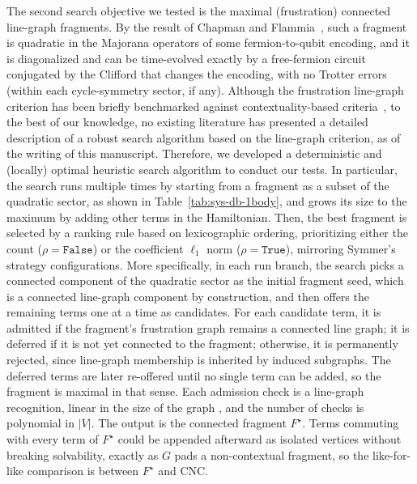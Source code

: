 \documentclass[%
 aip,
 amsmath,amssymb,
 reprint,%
]{revtex4-1}
\newcommand{\True}{\mathtt{True}}        %
\newcommand{\False}{\mathtt{False}}
\newcommand{\frag}{F}                    %
\newcommand{\rankflag}{\rho}             %
\begin{document}
The second search objective we tested is the maximal (frustration) connected line-graph fragments. {By the result} of Chapman and Flammia~\cite{Chapman_Fermions}, such a fragment is quadratic in the Majorana operators of some fermion-to-qubit encoding, and it is diagonalized and can be time-evolved exactly by a free-fermion circuit conjugated by the Clifford that changes the encoding, with no Trotter errors {(within each cycle-symmetry sector, if any)}. Although the frustration line-graph criterion has been briefly benchmarked against contextuality-based criteria~\cite{patel2024exactly}, to the best of our knowledge, no existing literature has presented a detailed description of a robust search algorithm based on the line-graph criterion, as of the writing of this manuscript. Therefore, we developed a deterministic and (locally) optimal heuristic search algorithm to conduct our tests. In particular, the search runs multiple times by starting from a fragment as a subset of the quadratic sector, as shown in Table~\ref{tab:sys-db-1body}, and grows its size to the maximum by adding other terms in the Hamiltonian. Then, the best fragment is selected by a ranking rule based on lexicographic ordering, prioritizing either the count ($\rankflag=\False$) or the coefficient $\ell_1$ norm ($\rankflag=\True$), mirroring Symmer's strategy configurations. More specifically, in each run branch, the search picks a connected component of the quadratic sector as the initial fragment seed, which is a connected line-graph component by construction, and then offers the remaining terms one at a time as candidates. For each candidate term, it is admitted if the fragment's frustration graph remains a connected line graph; it is deferred if it is not yet connected to the fragment; otherwise, it is permanently rejected, since line-graph membership is inherited by induced subgraphs. The deferred terms are later re-offered until no single term can be added, so the fragment is maximal in that sense. Each admission check is a line-graph recognition, linear in the size of the graph \cite{ROUSSOPOULOS1973108}, and the number of checks is polynomial in $|V|$. The output is the connected fragment $\frag^\star$. Terms commuting with every term of $\frag^\star$ could be appended afterward as isolated vertices without breaking solvability, exactly as $G$ pads a non-contextual fragment, so the like-for-like comparison is between $\frag^\star$ and CNC.
\end{document}
